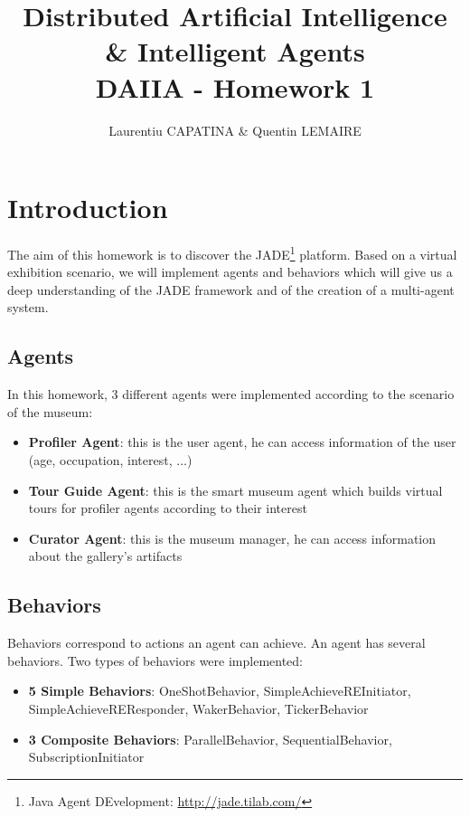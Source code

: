 \documentclass[a4paper,11pt]{article}
\title{Distributed Artificial Intelligence \& Intelligent Agents \\ DAIIA - Homework 1}
\author{Laurentiu CAPATINA \& Quentin LEMAIRE}
\begin{document}
  \maketitle %

  \section{Introduction}
  
  The aim of this homework is to discover the JADE\footnote{Java Agent DEvelopment: \href{http://jade.tilab.com/}{http://jade.tilab.com/}} platform. 
  Based on a virtual exhibition scenario, we will implement agents and behaviors which will give us a deep understanding of the JADE framework 
  and of the creation of a multi-agent system.
  
  
  \subsection{Agents}
  
  In this homework, 3 different agents were implemented according to the scenario of the museum:
  \begin{itemize}[label=--]
   \item \textbf{Profiler Agent}: this is the user agent, he can access information of the user (age, occupation, interest, ...)
   \item \textbf{Tour Guide Agent}: this is the smart museum agent which builds virtual tours for profiler agents according to their interest
   \item \textbf{Curator Agent}: this is the museum manager, he can access information about the gallery's artifacts
  \end{itemize}

  
  \subsection{Behaviors}
  
  Behaviors correspond to actions an agent can achieve. An agent has several behaviors. Two types of behaviors were implemented:
  \begin{itemize}[label=--]
   \item \textbf{5 Simple Behaviors}: OneShotBehavior, SimpleAchieveREInitiator, SimpleAchieveREResponder, WakerBehavior, TickerBehavior
   \item \textbf{3 Composite Behaviors}: ParallelBehavior, SequentialBehavior, SubscriptionInitiator
  \end{itemize}
  
\end{document}
